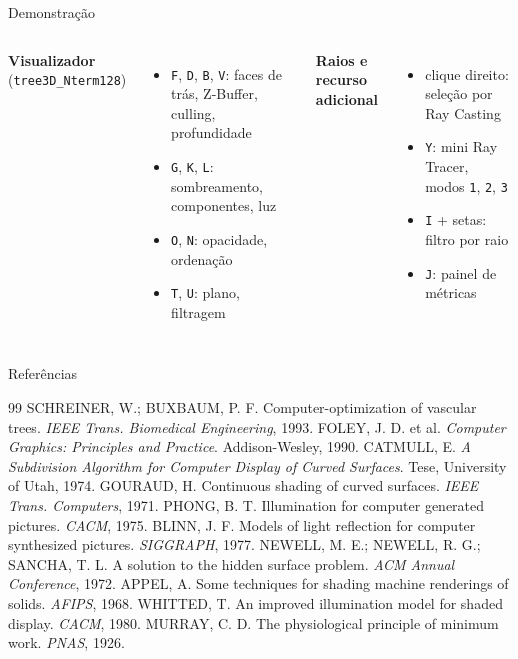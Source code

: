 \documentclass[aspectratio=169,11pt]{beamer}
\newcommand{\checkitem}{\textcolor{ufopred}{$\blacktriangleright$}}
\begin{document}
\begin{frame}{Demonstração}
\begin{columns}[t]
\textbf{Visualizador} {\small (\texttt{tree3D\_Nterm128})}
\small
\begin{itemize}
  \item[\checkitem] \texttt{F}, \texttt{D}, \texttt{B}, \texttt{V}: faces de trás, Z-Buffer, culling, profundidade
  \item[\checkitem] \texttt{G}, \texttt{K}, \texttt{L}: sombreamento, componentes, luz
  \item[\checkitem] \texttt{O}, \texttt{N}: opacidade, ordenação
  \item[\checkitem] \texttt{T}, \texttt{U}: plano, filtragem
\end{itemize}
\textbf{Raios e recurso adicional}
\small
\begin{itemize}
  \item[\checkitem] clique direito: seleção por Ray Casting
  \item[\checkitem] \texttt{Y}: mini Ray Tracer, modos \texttt{1}, \texttt{2}, \texttt{3}
  \item[\checkitem] \texttt{I} + setas: filtro por raio
  \item[\checkitem] \texttt{J}: painel de métricas
\end{itemize}
\end{columns}
\end{frame}

\begin{frame}{Referências}
\scriptsize
\begin{thebibliography}{99}
 SCHREINER, W.; BUXBAUM, P. F. Computer-optimization of vascular trees. \textit{IEEE Trans. Biomedical Engineering}, 1993.
 FOLEY, J. D. et al. \textit{Computer Graphics: Principles and Practice}. Addison-Wesley, 1990.
 CATMULL, E. \textit{A Subdivision Algorithm for Computer Display of Curved Surfaces}. Tese, University of Utah, 1974.
 GOURAUD, H. Continuous shading of curved surfaces. \textit{IEEE Trans. Computers}, 1971.
 PHONG, B. T. Illumination for computer generated pictures. \textit{CACM}, 1975.
 BLINN, J. F. Models of light reflection for computer synthesized pictures. \textit{SIGGRAPH}, 1977.
 NEWELL, M. E.; NEWELL, R. G.; SANCHA, T. L. A solution to the hidden surface problem. \textit{ACM Annual Conference}, 1972.
 APPEL, A. Some techniques for shading machine renderings of solids. \textit{AFIPS}, 1968.
 WHITTED, T. An improved illumination model for shaded display. \textit{CACM}, 1980.
 MURRAY, C. D. The physiological principle of minimum work. \textit{PNAS}, 1926.
\end{thebibliography}
\end{frame}
\end{document}
